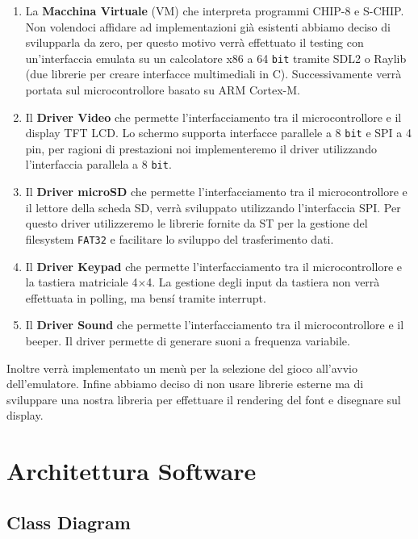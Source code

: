 \documentclass[a4paper]{article}
\begin{document}
\begin{enumerate}
	\item La \textbf{Macchina Virtuale} (VM) che interpreta programmi CHIP-8 e S-CHIP. Non volendoci affidare ad implementazioni già esistenti abbiamo deciso di svilupparla da zero, per questo motivo verrà effettuato il testing con un'interfaccia emulata su un calcolatore \textrm{x}86 a 64 \texttt{bit} tramite SDL2 o Raylib (due librerie per creare interfacce multimediali in C). Successivamente verrà portata sul microcontrollore basato su ARM Cortex-M.
	\item Il \textbf{Driver Video} che permette l'interfacciamento tra il microcontrollore e il display TFT LCD. Lo schermo supporta interfacce parallele a 8 \texttt{bit} e SPI a 4 pin, per ragioni di prestazioni noi implementeremo il driver utilizzando l'interfaccia parallela a 8 \texttt{bit}.
	\item Il \textbf{Driver microSD} che permette l'interfacciamento tra il microcontrollore e il lettore della scheda SD, verrà sviluppato utilizzando l'interfaccia SPI. Per questo driver utilizzeremo le librerie fornite da ST per la gestione del filesystem \texttt{FAT32} e facilitare lo sviluppo del trasferimento dati.
	\item Il \textbf{Driver Keypad} che permette l'interfacciamento tra il microcontrollore e la tastiera matriciale 4$\times$4. La gestione degli input da tastiera non verrà effettuata in polling, ma bens\'{i} tramite interrupt.
	\item Il \textbf{Driver Sound} che permette l'interfacciamento tra il microcontrollore e il beeper. Il driver permette di generare suoni a frequenza variabile.
\end{enumerate}

Inoltre verrà implementato un menù per la selezione del gioco all'avvio dell'emulatore. Infine abbiamo deciso di non usare librerie esterne ma di sviluppare una nostra libreria per effettuare il rendering del font e disegnare sul display.

\section{Architettura Software}

\subsection{Class Diagram}
\end{document}
